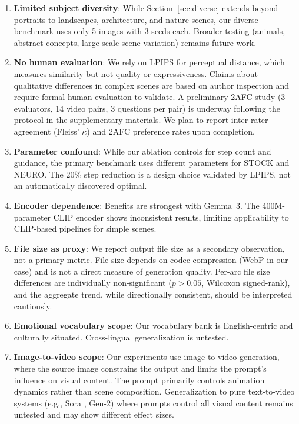 \documentclass[10pt,twocolumn,letterpaper]{article}
\begin{document}
\begin{enumerate}
    \item \textbf{Limited subject diversity}: While Section~\ref{sec:diverse} extends beyond portraits to landscapes, architecture, and nature scenes, our diverse benchmark uses only 5 images with 3 seeds each. Broader testing (animals, abstract concepts, large-scale scene variation) remains future work.
    \item \textbf{No human evaluation}: We rely on LPIPS for perceptual distance, which measures similarity but not quality or expressiveness. Claims about qualitative differences in complex scenes are based on author inspection and require formal human evaluation to validate. A preliminary 2AFC study (3 evaluators, 14 video pairs, 3 questions per pair) is underway following the protocol in the supplementary materials. We plan to report inter-rater agreement (Fleiss' $\kappa$) and 2AFC preference rates upon completion.
    \item \textbf{Parameter confound}: While our ablation controls for step count and guidance, the primary benchmark uses different parameters for STOCK and NEURO. The 20\% step reduction is a design choice validated by LPIPS, not an automatically discovered optimal.
    \item \textbf{Encoder dependence}: Benefits are strongest with Gemma~3. The 400M-parameter CLIP encoder shows inconsistent results, limiting applicability to CLIP-based pipelines for simple scenes.
    \item \textbf{File size as proxy}: We report output file size as a secondary observation, not a primary metric. File size depends on codec compression (WebP in our case) and is not a direct measure of generation quality. Per-arc file size differences are individually non-significant ($p > 0.05$, Wilcoxon signed-rank), and the aggregate trend, while directionally consistent, should be interpreted cautiously.
    \item \textbf{Emotional vocabulary scope}: Our vocabulary bank is English-centric and culturally situated. Cross-lingual generalization is untested.
    \item \textbf{Image-to-video scope}: Our experiments use image-to-video generation, where the source image constrains the output and limits the prompt's influence on visual content. The prompt primarily controls animation dynamics rather than scene composition. Generalization to pure text-to-video systems (e.g., Sora \cite{brooks2024}, Gen-2) where prompts control all visual content remains untested and may show different effect sizes.
\end{enumerate}
\end{document}

